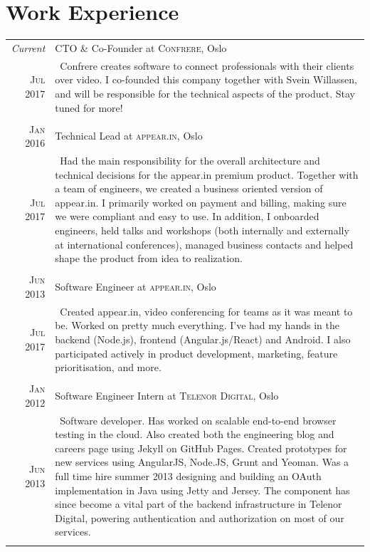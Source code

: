 \documentclass[a4paper,10pt]{article}
\begin{document}
\section{Work Experience}
\begin{tabular}{r|p{12cm}}
  \emph{Current} & CTO \& Co-Founder at \textsc{Confrere}, Oslo \\\textsc{Jul 2017}&\
  \footnotesize{Confrere creates software to connect professionals with their clients over video. I co-founded this company together with Svein Willassen, and will be responsible for the technical aspects of the product. Stay tuned for more!}\\\multicolumn{2}{c}{} \\
  \textsc{Jan 2016} & Technical Lead at \textsc{appear.in}, Oslo \\\textsc{Jul 2017}&\
  \footnotesize{Had the main responsibility for the overall architecture and technical decisions for the appear.in premium product. Together with a team of engineers, we created a business oriented version of appear.in. I primarily worked on payment and billing, making sure we were compliant and easy to use. In addition, I onboarded engineers, held talks and workshops (both internally and externally at international conferences), managed business contacts and helped shape the product from idea to realization.}\\\multicolumn{2}{c}{} \\
  \textsc{Jun 2013} & Software Engineer at \textsc{appear.in}, Oslo  \\\textsc{Jul 2017}&\
  \footnotesize{Created appear.in, video conferencing for teams as it was meant to be. Worked on pretty much everything. I've had my hands in the backend (Node.js), frontend (Angular.js/React) and Android. I also participated actively in product development, marketing, feature prioritisation, and more.}\\\multicolumn{2}{c}{} \\
  \textsc{Jan 2012} & Software Engineer Intern at \textsc{Telenor Digital}, Oslo  \\\textsc{Jun 2013}&\
  \footnotesize{Software developer. Has worked on scalable end-to-end browser testing in the cloud. Also created both the engineering blog and careers page using Jekyll on GitHub Pages. Created prototypes for new services using AngularJS, Node.JS, Grunt and Yeoman. Was a full time hire summer 2013 designing and building an OAuth implementation in Java using Jetty and Jersey. The component has since become a vital part of the backend infrastructure in Telenor Digital, powering authentication and authorization on most of our services.}\\\multicolumn{2}{c}{} \\
\end{tabular}
\end{document}
